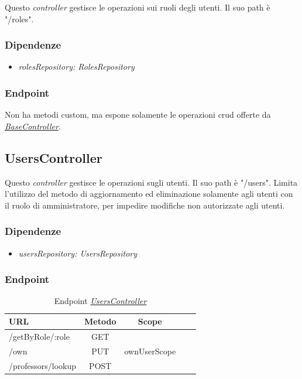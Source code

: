 Questo \textit{controller} gestisce le operazioni sui ruoli degli utenti. Il suo path è "/roles".
\subsubsection{Dipendenze}
\begin{itemize}[itemsep=0pt]
	\item \textit{rolesRepository: RolesRepository}
\end{itemize}

\subsubsection{Endpoint}

Non ha metodi custom, ma espone solamente le operazioni \acrshort{crud} offerte da \hyperref[server:base-controller]{\textit{BaseController}}.

\subsection{UsersController}

Questo \textit{controller} gestisce le operazioni sugli utenti. Il suo path è "/users". Limita l'utilizzo del metodo di aggiornamento ed eliminazione solamente agli utenti con il ruolo di amministratore, per impedire modifiche non autorizzate agli utenti.
\subsubsection{Dipendenze}
\begin{itemize}[itemsep=0pt]
	\item \textit{usersRepository: UsersRepository}
\end{itemize}

\subsubsection{Endpoint}
\label{server:users-controller}
\begin{table}[H]
	\ttfamily
	\caption{Endpoint \hyperref[server:users-controller]{\textit{UsersController}}}
	\centering
	\label{table:api:users-controller}
	\begin{tabular}{l c c c c}    
		URL  & Metodo & Scope \\ 
		\midrule
		/getByRole/:role & GET    \\
		/own & PUT & ownUserScope   \\
		/professors/lookup & POST   \\
		\bottomrule
	\end{tabular}
\end{table}

